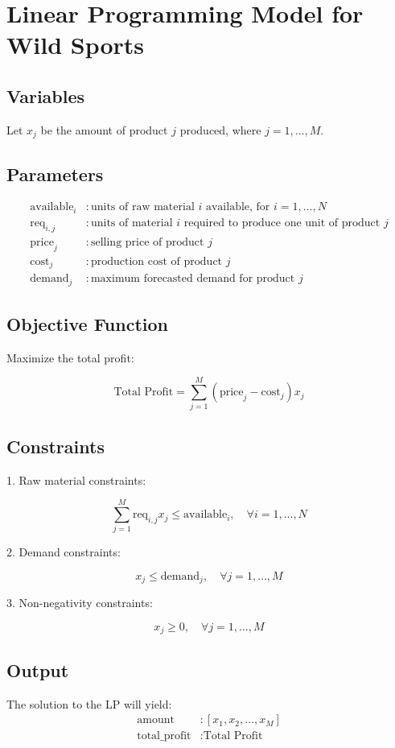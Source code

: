 \documentclass{article}
\begin{document}
\section*{Linear Programming Model for Wild Sports}

\subsection*{Variables}
Let \( x_j \) be the amount of product \( j \) produced, where \( j = 1, \ldots, M \). 

\subsection*{Parameters}
\begin{align*}
\text{available}_i & : \text{units of raw material } i \text{ available, for } i = 1, \ldots, N \\
\text{req}_{i,j} & : \text{units of material } i \text{ required to produce one unit of product } j \\
\text{price}_j & : \text{selling price of product } j \\
\text{cost}_j & : \text{production cost of product } j \\
\text{demand}_j & : \text{maximum forecasted demand for product } j
\end{align*}

\subsection*{Objective Function}
Maximize the total profit:

\[
\text{Total Profit} = \sum_{j=1}^{M} ( \text{price}_j - \text{cost}_j ) x_j
\]

\subsection*{Constraints}
1. Raw material constraints:

\[
\sum_{j=1}^{M} \text{req}_{i,j} x_j \leq \text{available}_i, \quad \forall i = 1, \ldots, N
\]

2. Demand constraints:

\[
x_j \leq \text{demand}_j, \quad \forall j = 1, \ldots, M
\]

3. Non-negativity constraints:

\[
x_j \geq 0, \quad \forall j = 1, \ldots, M
\]

\subsection*{Output}
The solution to the LP will yield:
\begin{align*}
\text{amount} & : [x_1, x_2, \ldots, x_M] \\
\text{total\_profit} & : \text{Total Profit}
\end{align*}
\end{document}
